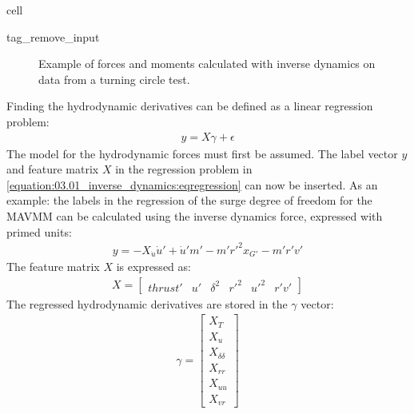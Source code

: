 \documentclass[review]{elsarticle}
\begin{document}
\begin{sphinxuseclass}{cell}
\begin{sphinxuseclass}{tag_remove_input}
\end{sphinxuseclass}
\end{sphinxuseclass}
\begin{figure}[H]
\centering
\capstart

\noindent{}
\caption{Example of forces and moments calculated with inverse dynamics on data from a turning circle test.}\label{\detokenize{03.01_inverse_dynamics:fig-inverse}}\end{figure}

\sphinxAtStartPar
Finding the hydrodynamic derivatives can be defined as a linear regression problem:
\begin{equation}\label{equation:03.01_inverse_dynamics:eqregression}
\begin{split}y = X\gamma + \epsilon\end{split}
\end{equation}
\sphinxAtStartPar
The model for the hydrodynamic forces must first be assumed.
The label vector \(y\) and feature matrix \(X\) in the regression problem in \autoref{equation:03.01_inverse_dynamics:eqregression} can now be inserted. As an example: the labels in the regression of the surge degree of freedom for the MAVMM can be calculated using the inverse dynamics force, expressed with primed units:
\begin{equation}\label{equation:03.01_inverse_dynamics:diff_eq_X_y}
\begin{split}\displaystyle y = - X_{\dot{u}} \dot{u}' + \dot{u}' m' - m' r'^{2} x_{G'} - m' r' v'\end{split}
\end{equation}
\sphinxAtStartPar
The feature matrix \(X\) is expressed as:
\begin{equation}\label{equation:03.01_inverse_dynamics:diff_eq_X_X}
\begin{split}\displaystyle X = \left[\begin{matrix}thrust' & u' & \delta^{2} & r'^{2} & u'^{2} & r' v'\end{matrix}\right]\end{split}
\end{equation}
\sphinxAtStartPar
The regressed hydrodynamic derivatives are stored in the \(\gamma\) vector:
\begin{equation}\label{equation:03.01_inverse_dynamics:diff_eq_X_beta}
\begin{split}\displaystyle \gamma = \left[\begin{matrix}X_{T}\\X_{u}\\X_{\delta\delta}\\X_{rr}\\X_{uu}\\X_{vr}\end{matrix}\right]\end{split}
\end{equation}
\end{document}
